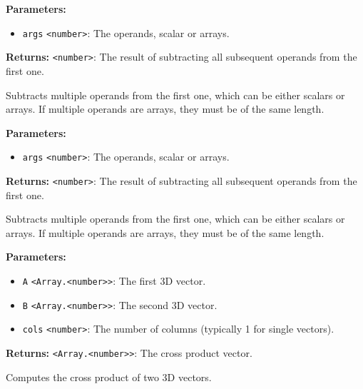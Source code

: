 \documentclass[12pt,a4paper]{article}
\begin{document}
\noindent \textbf{Parameters:}
\begin{itemize}
  \item \texttt{args} \texttt{<number>}: The operands, scalar or arrays.
\end{itemize}

\noindent \textbf{Returns:} \texttt{<number>}: The result of subtracting all subsequent operands from the first one.

\noindent Subtracts multiple operands from the first one, which can be either scalars or arrays.
If multiple operands are arrays, they must be of the same length.

\vspace{5mm}
\noindent {}


\noindent \textbf{Parameters:}
\begin{itemize}
  \item \texttt{args} \texttt{<number>}: The operands, scalar or arrays.
\end{itemize}

\noindent \textbf{Returns:} \texttt{<number>}: The result of subtracting all subsequent operands from the first one.

\noindent Subtracts multiple operands from the first one, which can be either scalars or arrays.
If multiple operands are arrays, they must be of the same length.

\vspace{5mm}
\noindent {}


\noindent \textbf{Parameters:}
\begin{itemize}
  \item \texttt{A} \texttt{<Array.<number>>}: The first 3D vector.
  \item \texttt{B} \texttt{<Array.<number>>}: The second 3D vector.
  \item \texttt{cols} \texttt{<number>}: The number of columns (typically 1 for single vectors).
\end{itemize}

\noindent \textbf{Returns:} \texttt{<Array.<number>>}: The cross product vector.

\noindent Computes the cross product of two 3D vectors.
\end{document}
